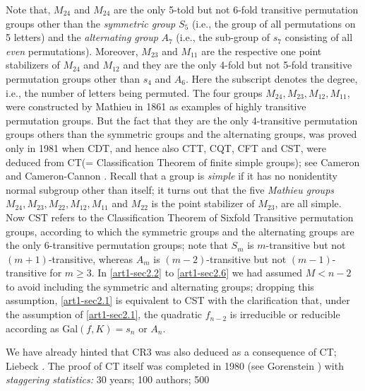 Note that, $M_{24}$ and $M_{24}$ are the only 5-told but not 6-fold transitive permutation groups other than the {\it symmetric group} $S_{5}$ (i.e., the group of all permutations on 5 letters) and the {\it alternating group} $A_{7}$ (i.e., the  sub-group of $s_{7}$ consisting of all {\it even} permutations). Moreover, $M_{23}$ and $M_{11}$ are the respective one point stabilizers of $M_{24}$ and $M_{12}$ and they are the only 4-fold but not 5-fold transitive permutation groups other than $s_{4}$ and $A_{6}$. Here the subscript denotes the degree, i.e., the number of letters being permuted. The four groups $M_{24}, M_{23}, M_{12}, M_{11}$, were constructed by Mathieu \cite{art1-key46} in 1861 as examples of highly transitive permutation groups. But the fact that they are the only 4-transitive permutation groups others than the symmetric groups and the alternating groups, was proved only in 1981 when CDT, and hence also CTT, CQT, CFT and CST, were deduced from  CT(= Classification Theorem of finite simple groups); see Cameron \cite{art1-key23} and Cameron-Cannon \cite{art1-key24}. Recall that a group is {\it simple} if it has no nonidentity normal subgroup other than itself; it turns out that the five {\it Mathieu groups} $M_{24}, M_{23}, M_{22}, M_{12}, M_{11}$ and $M_{22}$ is the point stabilizer of $M_{23}$, are all simple. Now CST refers to the Classification Theorem of Sixfold Transitive permutation groups, according to which the symmetric groups and the alternating groups are the only 6-transitive permutation groups; note that $S_{m}$ is $m$-transitive but not $(m+1)$-transitive, whereas $A_{m}$ is $(m-2)$-transitive but not $(m-1)$-transitive for $m\geq 3$. In \ref{art1-sec2.2} to \ref{art1-sec2.6} we had assumed $M<n-2$ to avoid including the symmetric and alternating groups; dropping this assumption, \ref{art1-sec2.1} is equivalent to CST with the clarification that, under the assumption of \ref{art1-sec2.1}, the quadratic $f_{n-2}$ is irreducible or reducible according as Gal$(f, K) = s_{n}$ or $A_{n}$.

We have already hinted that CR3 was also deduced as a consequence of CT; Liebeck \cite{art1-key44}. The proof of CT itself was completed in 1980 (see Gorenstein \cite{art1-key32}) with {\it staggering statistics:} 30 years; 100 authors; 500
  
 
